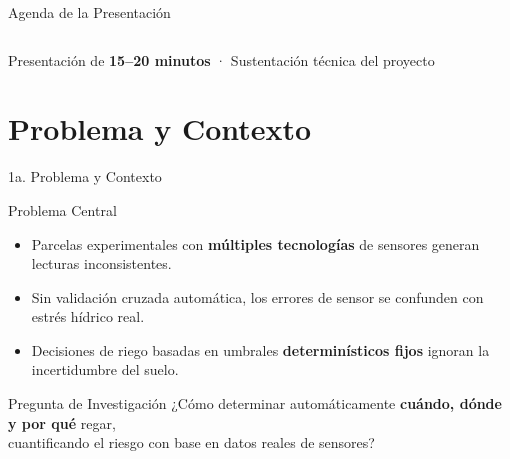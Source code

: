 \documentclass[11pt, aspectratio=169]{beamer}
\begin{document}
\begin{frame}{Agenda de la Presentación}
\begin{columns}[t]
\tableofcontents[sections={1-5}]
\tableofcontents[sections={6-10}]
\end{columns}
\vspace{0.4cm}
\begin{tcolorbox}[colback=SmartBlue!8,colframe=SmartBlue!40,
    arc=4pt,left=6pt,right=6pt,top=3pt,bottom=3pt]
\centering
{\small Presentación de \textbf{15--20 minutos} · Sustentación técnica del proyecto}
\end{tcolorbox}
\end{frame}

\setcounter{tocdepth}{1}

\section{Problema y Contexto}

\begin{frame}{1a. Problema y Contexto}
\begin{alertblock}{Problema Central}
\begin{itemize}
    \item[\textbullet] Parcelas experimentales con \textbf{múltiples tecnologías} de sensores generan lecturas inconsistentes.
    \item[\textbullet] Sin validación cruzada automática, los errores de sensor se confunden con estrés hídrico real.
    \item[\textbullet] Decisiones de riego basadas en umbrales \textbf{determinísticos fijos} ignoran la incertidumbre del suelo.
\end{itemize}
\end{alertblock}

\vfill

\begin{block}{Pregunta de Investigación}
\centering
¿Cómo determinar automáticamente \textbf{cuándo, dónde y por qué} regar,\\
cuantificando el riesgo con base en datos reales de sensores?
\end{block}
\end{frame}
\end{document}
